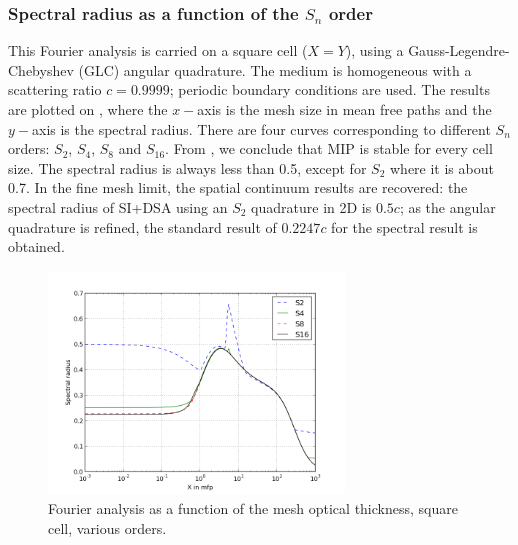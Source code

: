 \subsubsection{Spectral radius as a function of the $S_n$ order}

This Fourier analysis is carried on a square cell ($X=Y$), using a
Gauss-Legendre-Chebyshev (GLC) angular quadrature. The medium is homogeneous with a 
scattering ratio $c=0.9999$; periodic boundary conditions are used. The results 
are plotted on , where the $x-$axis is the mesh size in mean free 
paths and the $y-$axis is the spectral radius. There are four curves corresponding 
to different $S_n$ orders: $S_2$, $S_4$, $S_8$ and $S_{16}$.
From , we conclude that MIP is stable for every 
cell size. The spectral radius is always less than 0.5, except for $S_2$ where 
it is about 0.7. In the fine mesh limit, the spatial continuum results are recovered:
the spectral radius of SI+DSA using an $S_2$ quadrature in 2D is $0.5c$; as the angular 
quadrature is refined, the standard result of $0.2247c$ for the spectral result is obtained.
\begin{figure}[!htbp]
  \centering
  \includegraphics[width=0.7\textwidth]{sn_order_9999}
  \caption{Fourier analysis as a function of the mesh optical thickness, square cell,
    various \sn orders.}
  \label{fig_fa_sn}
\end{figure}

